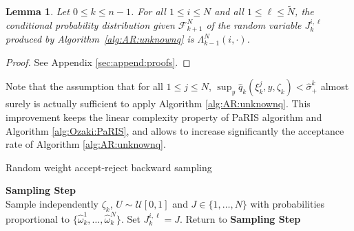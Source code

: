 \documentclass[12pt]{article}
\newcommand{\eqsp}{\;}
\newcommand{\1}{\mathrm{1}}
\newcommand{\qk}{q_{k}}
\newtheorem{lemma}{Lemma}
\begin{document}
\begin{lemma}
\label{lem:AR:unbiased}
Let $0\le k\le n-1$.  For all $1\le i \le N$ and all $1\le \ell \le \widetilde{N}$, the conditional probability distribution given $\mathcal{F}_{k+1}^N$ of the random variable $J_{k}^{i,\ell}$ produced by Algorithm~\ref{alg:AR:unknownq} is  $\Lambda_{k-1}^N(i,\cdot)$. 
\end{lemma}
\begin{proof}
See Appendix \ref{sec:append:proofs}.
\end{proof}
Note that the assumption that for all $1\le j\le N$, $\sup_y \hat{q}_k(\xi_k^j,y,\zeta_k)< \hat{\sigma}_+^k$ almost surely is actually sufficient to apply Algorithm \ref{alg:AR:unknownq}. This improvement keeps the linear complexity property of PaRIS algorithm and Algorithm \ref{alg:Ozaki:PaRIS}, and allows to increase significantly the acceptance rate of Algorithm \ref{alg:AR:unknownq}. %
\begin{algorithm}[H]
\caption{Random weight accept-reject backward sampling}
\begin{algorithmic}
\STATE \textbf{\sc Sampling Step} \\
Sample independently $
\zeta_k$, $U\sim \mathcal{U}[0,1]$ and $J\in\{1,\ldots,N\}$ with probabilities proportional to $\{\widehat{\omega}_{k}^1,\dots,\widehat{\omega}_{k}^N\}$.
\IF{ $$U \leq \frac{\widehat{\qk}(\xi_{k}^J,\xi_{k+1}^i,\zeta_k)}{\hat{\sigma}_+},$$}
\STATE Set $J_k^{i,\ell} = J$.
\ELSE 
\STATE Return to \textbf{\sc Sampling Step}
\ENDIF
\ENDFOR
\ENDFOR
\end{algorithmic}
\label{alg:AR:unknownq}
\end{algorithm}
\end{document}
